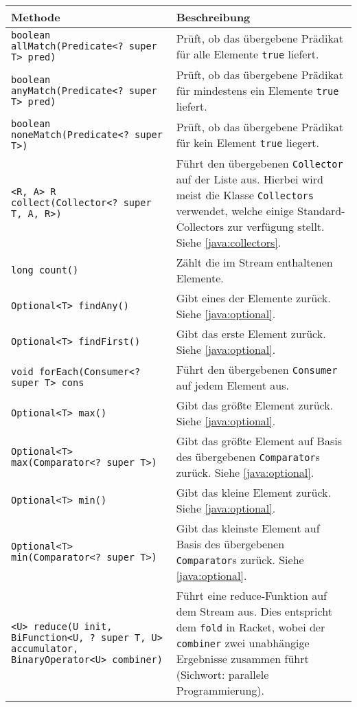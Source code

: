             \begin{sidewaystable}
                \centering
                \begin{tabular}{p{8cm} | p{13cm}}
                    Methode & Beschreibung \\
                    \hline
                    \texttt{boolean allMatch(Predicate<? super T> pred)} & Prüft, ob das übergebene Prädikat für alle Elemente \texttt{true} liefert. \\
                    \texttt{boolean anyMatch(Predicate<? super T> pred)} & Prüft, ob das übergebene Prädikat für mindestens ein Elemente \texttt{true} liefert. \\
                    \texttt{boolean noneMatch(Predicate<? super T>)} & Prüft, ob das übergebene Prädikat für kein Element \texttt{true} liegert. \\
                    \texttt{<R, A> R collect(Collector<? super T, A, R>)} & Führt den übergebenen \texttt{Collector} auf der Liste aus. Hierbei wird meist die Klasse \texttt{Collectors} verwendet, welche einige Standard-Collectors zur verfügung stellt. Siehe \ref{java:collectors}. \\
                    \texttt{long count()} & Zählt die im Stream enthaltenen Elemente. \\
                    \texttt{Optional<T> findAny()} & Gibt eines der Elemente zurück. Siehe \ref{java:optional}. \\
                    \texttt{Optional<T> findFirst()} & Gibt das erste Element zurück. Siehe \ref{java:optional}. \\
                    \texttt{void forEach(Consumer<? super T> cons} & Führt den übergebenen \texttt{Consumer} auf jedem Element aus. \\
                    \texttt{Optional<T> max()} & Gibt das größte Element zurück. Siehe \ref{java:optional}. \\
                    \texttt{Optional<T> max(Comparator<? super T>)} & Gibt das größte Element auf Basis des übergebenen \texttt{Comparator}s zurück. Siehe \ref{java:optional}. \\
                    \texttt{Optional<T> min()} & Gibt das kleine Element zurück. Siehe \ref{java:optional}. \\
                    \texttt{Optional<T> min(Comparator<? super T>)} & Gibt das kleinste Element auf Basis des übergebenen \texttt{Comparator}s zurück. Siehe \ref{java:optional}. \\
                    \texttt{<U> reduce(U init, BiFunction<U, ? super T, U> accumulator, BinaryOperator<U> combiner)} & Führt eine reduce-Funktion auf dem Stream aus. Dies entspricht dem \texttt{fold} in Racket, wobei der \texttt{combiner} zwei unabhängige Ergebnisse zusammen führt (Sichwort: parallele Programmierung). \\

\end{tabular}
\end{sidewaystable}
